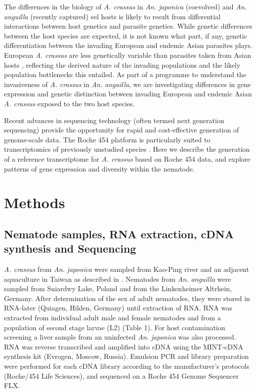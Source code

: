 \documentclass[10pt]{bmc_article}
\newenvironment{bmcformat}{\begin{raggedright}\baselineskip20pt\sloppy\setboolean{publ}{false}}{\end{raggedright}\baselineskip20pt\sloppy}
\begin{document}
\begin{bmcformat}
The differences in the biology of \textit{A. crassus} in
\textit{An. japonica} (coevolved) and \textit{An. anguilla} (recently
captured) eel hosts is likely to result from differential interactions
between host genetics and parasite genetics. While genetic differences
between the host species are expected, it is not known what part, if
any, genetic differentiation between the invading European and endemic
Asian parasites plays.  European \textit{A. crassus} are less
genetically variable than parasites taken from Asian hosts
\cite{wielgoss_population_2008}, reflecting the derived nature of the
invading populations and the likely population bottlenecks this
entailed. As part of a programme to understand the invasiveness of
\textit{A. crassus} in \textit{An. anguilla}, we are investigating
differences in gene expression and genetic distinction between
invading European and endemic Asian \textit{A. crassus} exposed to the
two host species.

Recent advances in sequencing technology (often termed next generation
sequencing) provide the opportunity for rapid and cost-effective
generation of genome-scale data. The Roche 454 platform
\cite{pmid16056220} is particularly suited to transcriptomics of
previously unstudied species \cite{pmid20950480}. Here we describe the
generation of a reference transcriptome for \textit{A. crassus} based
on Roche 454 data, and explore patterns of gene expression and
diversity within the nematode.

\section*{Methods}


\subsection*{Nematode samples, RNA extraction, cDNA synthesis and Sequencing}

\textit{A. crassus} from \textit{An. japonica} were sampled from
Kao-Ping river and an adjacent aquaculture in Taiwan as described in
\cite{heitlinger_massive_2009}. Nematodes from \textit{An. anguilla}
were sampled from Sniardwy Lake, Poland and from the Linkenheimer
Altrhein, Germany. After determination of the sex of adult nematodes,
they were stored in RNA-later (Quiagen, Hilden, Germany) until
extraction of RNA. RNA was extracted from individual adult male and
female nematodes and from a population of second stage larvae (L2)
(Table 1). For host contamination screening a liver sample from an
uninfected \textit{An. japonica} was also processed. RNA was reverse
transcribed and amplified into cDNA using the MINT-cDNA synthesis kit
(Evrogen, Moscow, Russia). Emulsion PCR and library preparation were
performed for each cDNA library according to the manufacturer's
protocols (Roche/454 Life Sciences), and sequenced on a Roche 454
Genome Sequencer FLX.


\end{bmcformat}
\end{document}
